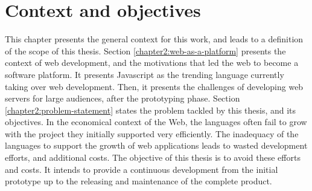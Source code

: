 \chapter{Context and objectives} \label{chapter2}
\minitoc
\eject

This chapter presents the general context for this work, and leads to a definition of the scope of this thesis.
Section \ref{chapter2:web-as-a-platform} presents the context of web development, and the motivations that led the web to become a software platform.
It presents Javascript as the trending language currently taking over web development.
Then, it presents the challenges of developing web servers for large audiences, after the prototyping phase.
Section \ref{chapter2:problem-statement} states the problem tackled by this thesis, and its objectives.
In the economical context of the Web, the languages often fail to grow with the project they initially supported very efficiently.
The inadequacy of the languages to support the growth of web applications leads to wasted development efforts, and additional costs.
The objective of this thesis is to avoid these efforts and costs.
It intends to provide a continuous development from the initial prototype up to the releasing and maintenance of the complete product.


